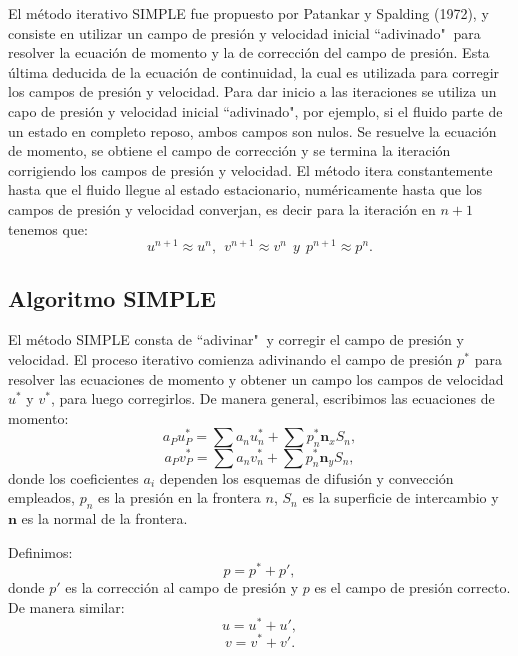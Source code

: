 \documentclass[a4paper,10pt, oneside]{book}
\begin{document}
El método iterativo SIMPLE fue propuesto por Patankar y Spalding (1972), y consiste en utilizar un campo de presión y velocidad inicial ``adivinado" $~$para resolver la ecuación de momento y la de corrección del campo de presión. Esta última deducida de la ecuación de continuidad, la cual es utilizada para corregir los campos de presión y velocidad. Para dar inicio a las iteraciones se utiliza un capo de presión y velocidad inicial ``adivinado", por ejemplo, si el fluido parte de un estado en completo reposo, ambos campos son nulos. Se resuelve la ecuación de momento, se obtiene el campo de corrección y se termina la iteración corrigiendo los campos de presión y velocidad. El método itera constantemente hasta que el fluido llegue al estado estacionario, numéricamente hasta que los campos de presión y velocidad converjan, es decir para la iteración en $n+1$ tenemos que:
\begin{equation}
	u^{n+1} \approx u^n, ~~ v^{n+1} \approx v^n ~~y~~ p^{n+1} \approx p^n. \nonumber
\end{equation}

\subsection{Algoritmo SIMPLE}

El método SIMPLE consta de ``adivinar" $~$y corregir el campo de presión y velocidad. El proceso iterativo comienza adivinando el campo de presión $p^*$ para resolver las ecuaciones de momento y obtener un campo los campos de velocidad $u^*$ y $v^*$, para luego corregirlos. De manera general, escribimos las ecuaciones de momento:
\begin{equation}
  a_{P}u_{P}^* = \sum a_{n}u_{n}^* + \sum p^*_n \mathbf{n}_x S_n,
  \label{eq:momentoSIMPLEu}
\end{equation}
\begin{equation}
  a_{P}v_{P}^* = \sum a_{n}v_{n}^* + \sum p^*_n \mathbf{n}_y S_n,
  \label{eq:momentoSIMPLEv}
\end{equation}
donde los coeficientes $a_i$ dependen los esquemas de difusión y convección empleados, $p_n$ es la presión en la frontera $n$, $S_n$ es la superficie de intercambio y $\mathbf{n}$ es la normal de la frontera.

Definimos:
\begin{equation}
  p = p^* + p',
  \label{eq:correccionp}
\end{equation}
donde $p'$ es la corrección al campo de presión y $p$ es el campo de presión correcto. De manera similar:
\begin{equation}
  u = u^* + u',
  \label{eq:correccionu}
\end{equation}
\begin{equation}
  v = v^* + v'.
  \label{eq:correccionv}
\end{equation}
\end{document}
